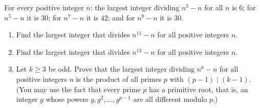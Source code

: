 For every positive integer $n$: the largest integer dividing $n^3-n$ for all $n$ is $6$; for $n^5-n$ it is $30$; for $n^7-n$ it is $42$; and for $n^9-n$ it is $30$.
\begin{enumerate}
\item[(a)] Find the largest integer that divides $n^{11}-n$ for all positive integers $n$.
\item[(b)] Find the largest integer that divides $n^{13}-n$ for all positive integers $n$.
\item[(c)] Let $k\ge3$ be odd. Prove that the largest integer dividing $n^k-n$ for all positive integers $n$ is the product of all primes $p$ with $(p-1)\mid(k-1)$. (You may use the fact that every prime $p$ has a primitive root, that is, an integer $g$ whose powers $g,g^2,\ldots,g^{p-1}$ are all different modulo $p$.)
\end{enumerate}
